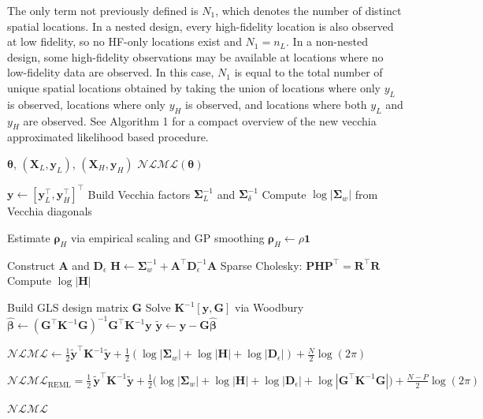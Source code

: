 \documentclass[12pt]{article}
\begin{document}
\noindent

The only term not previously defined is $N_1$, which denotes the number of distinct spatial locations.
In a nested design, every high-fidelity location is also observed at low fidelity, so no HF-only locations exist and $N_1 = n_L$.
In a non-nested design, some high-fidelity observations may be available at locations where no low-fidelity data are observed.
In this case, $N_1$ is equal to the total number of unique spatial locations obtained by taking the union of locations where only $y_L$ is observed, locations where only $y_H$ is observed, and locations where both $y_L$ and $y_H$ are observed. See Algorithm 1 for a compact overview of the new vecchia approximated likelihood based procedure.


\clearpage   %

\begin{algorithm}[t]
\caption{Vecchia-based MFGP likelihood with GLS mean removal}
\label{alg:vecchia_mfgp_gls}
\footnotesize
\begin{algorithmic}[1]
\Require $\boldsymbol{\theta}$, $(\bm{X}_L,\bm{y}_L)$, $(\bm{X}_H,\bm{y}_H)$
\Ensure $\mathcal{NLML}(\boldsymbol{\theta})$

\State $\bm{y}\leftarrow[\bm{y}_L^\top,\bm{y}_H^\top]^\top$
\State Build Vecchia factors $\boldsymbol{\Sigma}_L^{-1}$ and $\boldsymbol{\Sigma}_\delta^{-1}$
\State Compute $\log|\boldsymbol{\Sigma}_w|$ from Vecchia diagonals

    \State Estimate $\boldsymbol{\rho}_H$ via empirical scaling and GP smoothing
\Else
    \State $\boldsymbol{\rho}_H\leftarrow\rho\bm{1}$
\EndIf

\State Construct $\bm{A}$ and $\bm{D}_\epsilon$
\State $\bm{H}\leftarrow \boldsymbol{\Sigma}_w^{-1}+\bm{A}^\top\bm{D}_\epsilon^{-1}\bm{A}$
\State Sparse Cholesky: $\bm{P}\bm{H}\bm{P}^\top=\bm{R}^\top\bm{R}$
\State Compute $\log|\bm{H}|$

\State Build GLS design matrix $\bm{G}$
\State Solve $\bm{K}^{-1}[\bm{y},\bm{G}]$ via Woodbury
\State $\hat{\boldsymbol{\beta}}\leftarrow(\bm{G}^\top\bm{K}^{-1}\bm{G})^{-1}\bm{G}^\top\bm{K}^{-1}\bm{y}$
\State $\tilde{\bm{y}}\leftarrow\bm{y}-\bm{G}\hat{\boldsymbol{\beta}}$

\State $\mathcal{NLML}\leftarrow \frac12\tilde{\bm{y}}^\top\bm{K}^{-1}\tilde{\bm{y}}
+\frac12(\log|\boldsymbol{\Sigma}_w|+\log|\bm{H}|+\log|\bm{D}_\epsilon|)
+\frac{N}{2}\log(2\pi)$

\Else
\State   
$\mathcal{NLML}_{\mathrm{REML}}
=
\frac{1}{2}\,
\tilde{\bm y}^{\top}\bm K^{-1}\tilde{\bm y}
+
\frac{1}{2}
\Big(
\log|\boldsymbol{\Sigma}_w|
+
\log|\bm H|
+
\log|\bm D_{\epsilon}|
+
\log|\bm G^{\top}\bm K^{-1}\bm G|
\Big)
+
\frac{N-P}{2}\log(2\pi)$
\EndIf

\State \Return $\mathcal{NLML}$
\end{algorithmic}
\end{algorithm}
\end{document}
